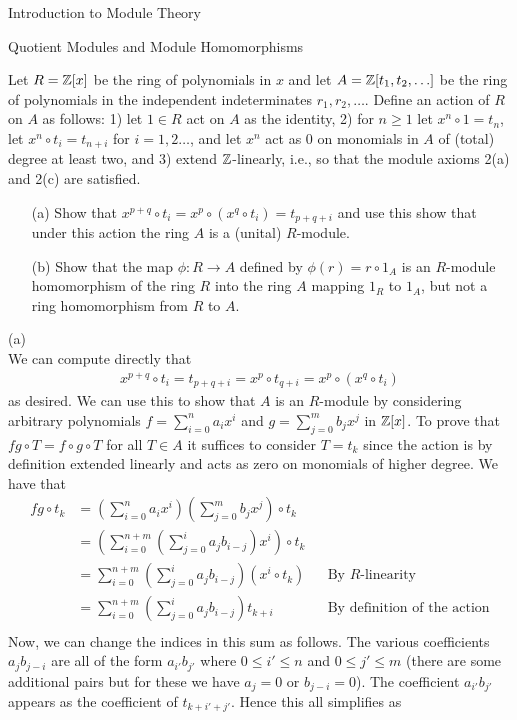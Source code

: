 \begin{chapter}{Introduction to Module Theory}
\begin{section}{Quotient Modules and Module Homomorphisms}
\begin{problem}\label{ex:10.2.14}
Let $R=\mathbb{Z}[x]$ be the ring of polynomials in $x$ and let $A = \mathbb{Z}[t_1,t_2,\ldots]$ be the ring of polynomials in the independent indeterminates $r_1,r_2,\ldots$. Define an action of $R$ on $A$ as follows: 1) let $1\in R$ act on $A$ as the identity, 2) for $n\ge 1$ let $x^n\circ 1 = t_n$, let $x^n\circ t_i = t_{n+i}$ for $i=1,2\ldots$, and let $x^n$ act as $0$ on monomials in $A$ of (total) degree at least two, and 3) extend $\mathbb{Z}$-linearly, i.e., so that the module axioms 2(a) and 2(c) are satisfied. \begin{enumerate}
\item[(a)] Show that $x^{p+q}\circ t_i = x^p\circ(x^q\circ t_i) = t_{p+q+i}$ and use this show that under this action the ring $A$ is a (unital) $R$-module.
\item[(b)] Show that the map $\phi:R\to A$ defined by $\phi(r) = r\circ 1_A$ is an $R$-module homomorphism of the ring $R$ into the ring $A$ mapping $1_R$ to $1_A$, but not a ring homomorphism from $R$ to $A$.
\end{enumerate}
\end{problem}
\begin{solution}
(a)\\
We can compute directly that \begin{align*}
x^{p+q}\circ t_i = t_{p+q+i} = x^p\circ t_{q+i} = x^p\circ(x^q\circ t_i)
\end{align*}
as desired. We can use this to show that $A$ is an $R$-module by considering arbitrary polynomials $f = \sum_{i=0}^n a_ix^i$ and $g =\sum_{j=0}^m b_jx^j$ in $ \mathbb{Z}[x]$. To prove that $fg\circ T = f\circ g\circ T$ for all $T\in A$ it suffices to consider $T=t_k$ since the action is by definition extended linearly and acts as zero on monomials of higher degree. We have that\begin{align*}
fg\circ t_k& = \left(\sum_{i=0}^n a_ix^i\right)\left(\sum_{j=0}^m b_jx^j\right)\circ t_k\\
& = \left(\sum_{i=0}^{n+m} \left(\sum_{j=0}^ia_jb_{i-j}\right)x^i\right)\circ t_k\\
& = \sum_{i=0}^{n+m} \left(\sum_{j=0}^ia_jb_{i-j}\right)(x^i\circ t_k)&&\text{By $R$-linearity}\\
& = \sum_{i=0}^{n+m} \left(\sum_{j=0}^ia_jb_{i-j}\right)t_{k+i}&&\text{By definition of the action}\\
\end{align*}
Now, we can change the indices in this sum as follows. The various coefficients $a_jb_{j-i}$ are all of the form $a_{i'}b_{j'}$ where $0\le i' \le n$ and $0\le j'\le m$ (there are some additional pairs but for these we have $a_j = 0$ or $b_{j-i} = 0$). The coefficient $a_{i'}b_{j'}$ appears as the coefficient of $t_{k+i'+j'}$. Hence this all simplifies  as \begin{align*}

\end{align*}
\end{solution}
\end{section}
\end{chapter}
